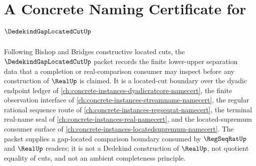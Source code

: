 \chapter{A Concrete Naming Certificate for $\DedekindGapLocatedCutUp$}
\label{ch:concrete-instances-dedekind-gap-located-cut-namecert}

Following Bishop and Bridges constructive located cuts, the $\DedekindGapLocatedCutUp$ packet records the finite lower-upper separation data that a completion or real-comparison consumer may inspect before any construction of $\RealUp$ is claimed. It is a located-cut boundary over the dyadic endpoint ledger of \autoref{ch:concrete-instances-dyadicratcore-namecert}, the finite observation interface of \autoref{ch:concrete-instances-streamname-namecert}, the regular rational sequence route of \autoref{ch:concrete-instances-regseqrat-namecert}, the terminal real-name seal of \autoref{ch:concrete-instances-real-namecert}, and the located-supremum consumer surface of \autoref{ch:concrete-instances-locatedsupremum-namecert}. The packet supplies a gap-located comparison boundary consumed by $\RegSeqRatUp$ and $\RealUp$ readers; it is not a Dedekind construction of $\RealUp$, not quotient equality of cuts, and not an ambient completeness principle.

